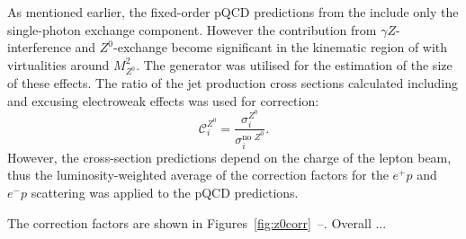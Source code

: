 As mentioned earlier, the fixed-order pQCD predictions from the \nlojet include only the single-photon exchange component. However the contribution from $\gamma Z$-interference and $Z^0$-exchange become significant in the kinematic region of with virtualities around $M_{Z^0}^{2}$. The \lepto generator was utilised for the estimation of the size of these effects. The ratio of the jet production cross sections calculated including and excusing electroweak effects was used for correction:
\begin{equation}
 \mathcal{C}^\text{$Z^0$}_i = \frac{\sigma_i^\text{$Z^0$}}{\sigma_i^\text{no $Z^0$}}.
 \label{eq:z0corr}
\end{equation}
However, the cross-section predictions depend on the charge of the lepton beam, thus the luminosity-weighted average of the correction factors for the $e^+p$ and $e^-p$ scattering was applied to the pQCD predictions.

The correction factors are shown in Figures~\ref{fig:z0corr}~--. Overall ...


